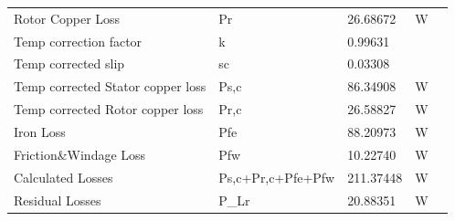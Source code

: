 \begin{table}[hbtp!]
\begin{tabular}{>{\columncolor[HTML]{9B9B9B}}l llll}
    Rotor   Copper Loss                                 & Pr                                        & 26.68672                          & W                            &  \\
    Temp   correction factor                            & \cellcolor[HTML]{F2F2F2}k                 & \cellcolor[HTML]{F2F2F2}0.99631   & \cellcolor[HTML]{F2F2F2}     &  \\
    Temp corrected   slip                               & sc                                        & 0.03308                           &                              &  \\
    Temp   corrected Stator copper loss                 & \cellcolor[HTML]{F2F2F2}Ps,c              & \cellcolor[HTML]{F2F2F2}86.34908  & \cellcolor[HTML]{F2F2F2}W    &  \\
    Temp   corrected Rotor copper loss                  & Pr,c                                      & 26.58827                          & W                            &  \\
    Iron Loss                                           & \cellcolor[HTML]{F2F2F2}Pfe               & \cellcolor[HTML]{F2F2F2}88.20973  & \cellcolor[HTML]{F2F2F2}W    &  \\
    Friction\&Windage   Loss                            & Pfw                                       & 10.22740                          & W                            &  \\
    Calculated   Losses                                 & \cellcolor[HTML]{F2F2F2}Ps,c+Pr,c+Pfe+Pfw & \cellcolor[HTML]{F2F2F2}211.37448 & \cellcolor[HTML]{F2F2F2}W    &  \\
    Residual   Losses                                   & P\_Lr                                     & 20.88351                          & W                            & 
\end{tabular}
\end{table}

